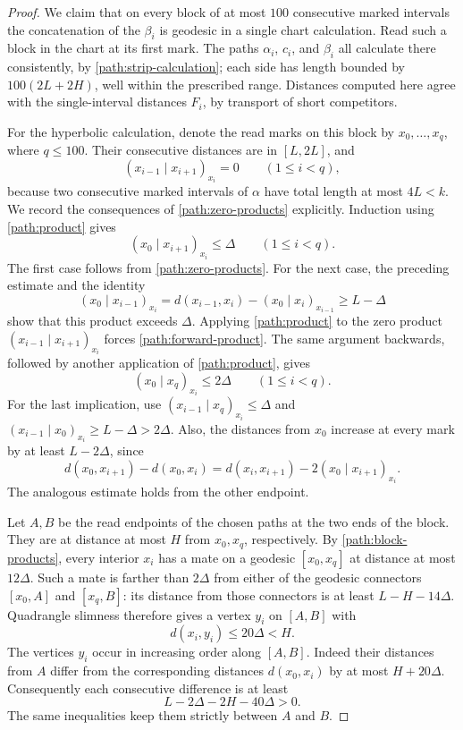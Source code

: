 \documentclass[11pt,reqno]{amsart}
\numberwithin{equation}{section}
\theoremstyle{definition}
\theoremstyle{remark}
\begin{document}
\begin{proof}
We claim that on every block of at most $100$ consecutive marked
intervals the concatenation of the $\beta_i$ is geodesic in a single
chart calculation.  Read such a block in the chart at its first mark.
The paths $\alpha_i$, $c_i$, and $\beta_i$ all calculate there
consistently, by \eqref{path:strip-calculation}; each side has length
bounded by $100(2L+2H)$, well within the prescribed range.  Distances
computed here agree with the single-interval distances $F_i$, by
transport of short competitors.

For the hyperbolic calculation, denote the read marks on this block by
$x_0,\ldots,x_q$, where $q\le100$.  Their consecutive distances are in
$[L,2L]$, and
\begin{equation}\label{path:zero-products}
 (x_{i-1}\mid x_{i+1})_{x_i}=0\qquad(1\le i<q),
\end{equation}
because two consecutive marked intervals of $\alpha$ have total length
at most $4L<k$.  We record the consequences of
\eqref{path:zero-products} explicitly.  Induction using
\eqref{path:product} gives
\begin{equation}\label{path:forward-product}
 (x_0\mid x_{i+1})_{x_i}\le\Delta\qquad(1\le i<q).
\end{equation}
The first case follows from \eqref{path:zero-products}.  For the next
case, the preceding estimate and the identity
\[
 (x_0\mid x_{i-1})_{x_i}
 =d(x_{i-1},x_i)-(x_0\mid x_i)_{x_{i-1}}
 \ge L-\Delta
\]
show that this product exceeds $\Delta$.  Applying
\eqref{path:product} to the zero product
$(x_{i-1}\mid x_{i+1})_{x_i}$ forces
\eqref{path:forward-product}.  The same argument backwards, followed
by another application of \eqref{path:product}, gives
\begin{equation}\label{path:block-products}
 (x_0\mid x_q)_{x_i}\le2\Delta\qquad(1\le i<q).
\end{equation}
For the last implication, use
$(x_{i-1}\mid x_q)_{x_i}\le\Delta$ and
$(x_{i-1}\mid x_0)_{x_i}\ge L-\Delta>2\Delta$.
Also, the distances from $x_0$ increase at every mark by at least
$L-2\Delta$, since
\[
 d(x_0,x_{i+1})-d(x_0,x_i)
 =d(x_i,x_{i+1})-2(x_0\mid x_{i+1})_{x_i}.
\]
The analogous estimate holds from the other endpoint.

Let $A,B$ be the read endpoints of the chosen paths at the two ends of
the block.  They are at distance at most $H$ from $x_0,x_q$,
respectively.  By \eqref{path:block-products}, every interior $x_i$
has a mate on a geodesic $[x_0,x_q]$ at distance at most $12\Delta$.
Such a mate is farther than $2\Delta$ from either of the geodesic
connectors $[x_0,A]$ and $[x_q,B]$: its distance from those connectors
is at least $L-H-14\Delta$.  Quadrangle slimness therefore gives a
vertex $y_i$ on $[A,B]$ with
\begin{equation}\label{path:block-mates}
 d(x_i,y_i)\le20\Delta<H.
\end{equation}
The vertices $y_i$ occur in increasing order along $[A,B]$.  Indeed
their distances from $A$ differ from the corresponding distances
$d(x_0,x_i)$ by at most $H+20\Delta$.  Consequently each consecutive
difference is at least
\[
 L-2\Delta-2H-40\Delta>0.
\]
The same inequalities keep them strictly between $A$ and $B$.


\end{proof}
\end{document}
